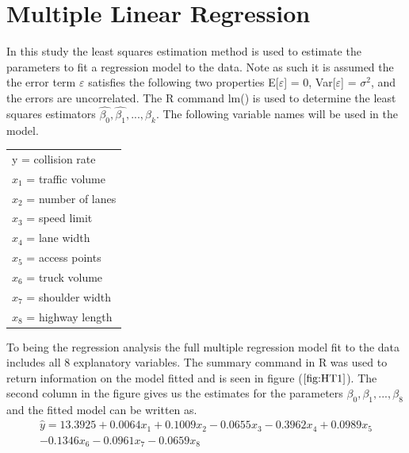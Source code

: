 \documentclass[12pt]{report}
\begin{document}
\section{Multiple Linear Regression}
In this study the least squares estimation method is used to estimate the parameters to fit a regression model to the data. Note as such it is assumed the the error term $\varepsilon$ satisfies the following two properties E[$\varepsilon$] = 0, Var[$\varepsilon$] = $\sigma^2$, and the errors are uncorrelated. The R command lm() is used to determine the least squares estimators $\hat{\beta_{0}},\hat{\beta_{1}},...,\hat{\beta_{k}}$.
The following variable names will be used in the model.

\begin{table}[h]
\centering
\begin{tabular}{|ll|}
\hline
\multicolumn{2}{|l|}{y = collision rate}   \\
\multicolumn{2}{|l|}{$x_{1}$ =  traffic volume} \\
\multicolumn{2}{|l|}{$x_{2}$ = number of lanes} \\
\multicolumn{2}{|l|}{$x_{3}$ = speed limit}     \\
\multicolumn{2}{|l|}{$x_{4}$ = lane width}      \\
\multicolumn{2}{|l|}{$x_{5}$ = access points}   \\
\multicolumn{2}{|l|}{$x_{6}$ = truck volume}    \\
\multicolumn{2}{|l|}{$x_{7}$ = shoulder width}  \\
\multicolumn{2}{|l|}{$x_{8}$ = highway length}  \\ \hline
\end{tabular}
\end{table}

To being the regression analysis the full multiple regression model fit to the data includes all 8 explanatory variables. The summary command in R was used to return information on the model fitted and is seen in figure ($\ref{fig:HT1}$). The second column in the figure gives us the estimates for the parameters $\beta_{0},\beta_{1},...,\beta_{8}$ and the fitted model can be written as.
\begin{equation}
    \begin{aligned}
    \hat{y} = 13.3925 + 0.0064x_{1} + 0.1009x_{2} - 0.0655x_{3} - 0.3962x_{4} + 0.0989x_{5}\\ - 0.1346x_{6} - 0.0961x_{7} - 0.0659x_{8}
    \end{aligned}
\end{equation} 
\end{document}
